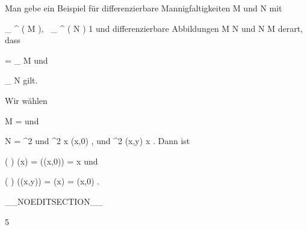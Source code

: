 {

Man gebe ein Beispiel für differenzierbare Mannigfaltigkeiten
\mathkor {} {M} {und} {N} {}
mit

\mavergleichskette
{\vergleichskette
{ _{  } ^{  }  \left(   M   \right), \, _{  } ^{  }  \left(   N   \right)
}
{ \geq }{ 1
}
{  }{
}
{    }{
}
{   }{
}
}
{}{}{}
und differenzierbare Abbildungen
\maabb {\varphi} { M } { N
} {}
und
\maabb {\psi} { N } { M
} {}
derart, dass

\mavergleichskette
{\vergleichskette
{ \psi \circ \varphi
}
{ = }{
_{ M }
}
{  }{
}
{    }{
}
{   }{
}
}
{}{}{}
und

\mavergleichskette
{\vergleichskette
{\varphi \circ  \psi
}
{ \neq }{
_{ N }
}
{  }{
}
{    }{
}
{   }{
}
}
{}{}{}
gilt.

}
{

Wir wählen

\mavergleichskette
{\vergleichskette
{M
}
{ = }{\R
}
{  }{
}
{    }{
}
{   }{
}
}
{}{}{}
und

\mavergleichskette
{\vergleichskette
{N
}
{ = }{\R^2
}
{  }{
}
{    }{
}
{   }{
}
}
{}{}{}
und
\maabbeledisp {\varphi} {\R} {\R^2
} { x } {(x,0)
} {,}
und
\maabbeledisp {\psi} {\R^2} {\R
} {(x,y)} { x
} {.}
Dann ist

\mavergleichskettedisp
{\vergleichskette
{ \left(  \psi \circ \varphi  \right) (x)
}
{ =} { \psi((x,0))
}
{ =} { x
}
{ } {
}
{ } {
}
}
{}{}{}
und

\mavergleichskettedisp
{\vergleichskette
{ \left(  \varphi  \circ \psi  \right) ((x,y))
}
{ =} { \varphi (x)
}
{ =} {(x,0)
}
{ } {
}
{ } {
}
}
{}{}{.}

 }

__NOEDITSECTION__

{5}

